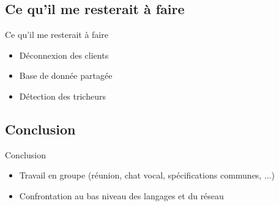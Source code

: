 \documentclass{beamer}
\begin{document}
\subsection{Ce qu'il me resterait à faire}
\begin{frame}
\begin{block}{Ce qu'il me resterait à faire}
\begin{itemize}
\item Déconnexion des clients
\item Base de donnée partagée
\item Détection des tricheurs
\end{itemize}
\end{block}
\end{frame}

\subsection{Conclusion}
\begin{frame}
\begin{block}{Conclusion}
\begin{itemize}
\item Travail en groupe (réunion, chat vocal, spécifications communes,
  ...)
\item Confrontation au bas niveau des langages et du réseau
\end{itemize}
\end{block}
\end{frame}
\end{document}

